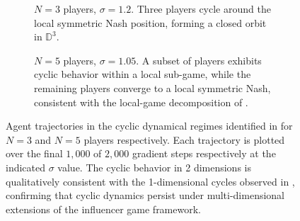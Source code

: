 \documentclass{article}
\begin{document}
    \begin{figure}[ht!]
        \centering
        \begin{subfigure}[b]{0.45\linewidth}
            \centering
            
            \caption{$N = 3$ players, $\sigma = 1.2$. Three players cycle around the local symmetric Nash position, forming a closed orbit in $\mathbb{D}^3$.}\label{fig:2d_cycles:a}
            \vspace{4ex}
        \end{subfigure}
        \begin{subfigure}[b]{0.45\linewidth}
                \centering
                
                \caption{$N = 5$ players, $\sigma = 1.05$. A subset of players exhibits cyclic behavior within a local sub-game, while the remaining players converge to a local symmetric Nash, consistent with the local-game decomposition of .}\label{fig:2d_cycles:b}
                \vspace{4ex}
        \end{subfigure}

        \caption{Agent trajectories in the cyclic dynamical regimes identified in  for $N = 3$ and $N = 5$ players respectively. Each trajectory is plotted over the final $1{,}000$ of $2{,}000$ gradient steps respectively at the indicated $\sigma$ value. The cyclic behavior in 2 dimensions is qualitatively consistent with the 1-dimensional cycles observed in , confirming that cyclic dynamics persist under multi-dimensional extensions of the influencer game framework.}\label{fig:2d_cycles}
    \end{figure}
\end{document}
